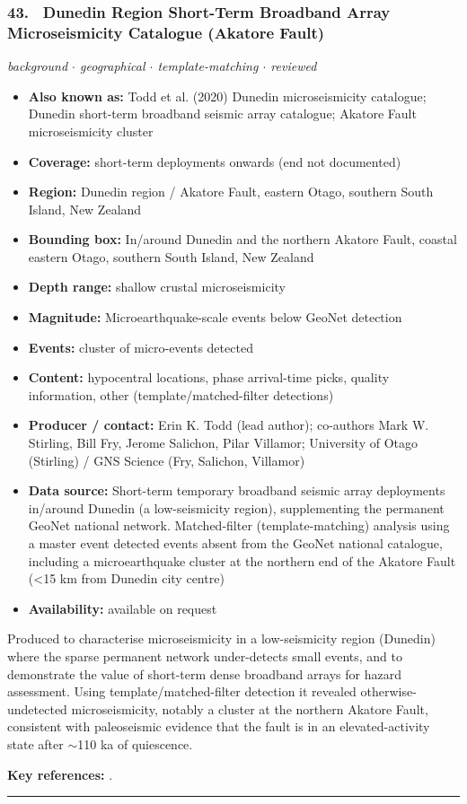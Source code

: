 \documentclass[10pt,a4paper]{article}
\newcommand{\catentryrule}{\par\vspace{3pt}\noindent\textcolor{rulegrey}{\rule{\linewidth}{0.3pt}}\par\vspace{5pt}}
\newcommand{\kv}[2]{\item \textbf{#1:} #2}
\begin{document}
\subsubsection*{\hypertarget{c:43}{43.}~ Dunedin Region Short-Term Broadband Array Microseismicity Catalogue (Akatore Fault)}
{\small\itshape background $\cdot$ geographical $\cdot$ template-matching $\cdot$ reviewed}\par\vspace{2pt}
\begin{itemize}[leftmargin=1.3em,itemsep=0.6pt,topsep=1pt,parsep=0pt]
\kv{Also known as}{Todd et al. (2020) Dunedin microseismicity catalogue; Dunedin short-term broadband seismic array catalogue; Akatore Fault microseismicity cluster}
\kv{Coverage}{short-term deployments onwards (end not documented)}
\kv{Region}{Dunedin region / Akatore Fault, eastern Otago, southern South Island, New Zealand}
\kv{Bounding box}{In/around Dunedin and the northern Akatore Fault, coastal eastern Otago, southern South Island, New Zealand}
\kv{Depth range}{shallow crustal microseismicity}
\kv{Magnitude}{Microearthquake-scale events below GeoNet detection}
\kv{Events}{cluster of micro-events detected}
\kv{Content}{hypocentral locations, phase arrival-time picks, quality information, other (template/matched-filter detections)}
\kv{Producer / contact}{Erin K. Todd (lead author); co-authors Mark W. Stirling, Bill Fry, Jerome Salichon, Pilar Villamor; University of Otago (Stirling) / GNS Science (Fry, Salichon, Villamor)}
\kv{Data source}{Short-term temporary broadband seismic array deployments in/around Dunedin (a low-seismicity region), supplementing the permanent GeoNet national network. Matched-filter (template-matching) analysis using a master event detected events absent from the GeoNet national catalogue, including a microearthquake cluster at the northern end of the Akatore Fault (\textless{}15 km from Dunedin city centre)}
\kv{Availability}{available on request}
\end{itemize}
\par\vspace{2pt}Produced to characterise microseismicity in a low-seismicity region (Dunedin) where the sparse permanent network under-detects small events, and to demonstrate the value of short-term dense broadband arrays for hazard assessment. Using template/matched-filter detection it revealed otherwise-undetected microseismicity, notably a cluster at the northern Akatore Fault, consistent with paleoseismic evidence that the fault is in an elevated-activity state after $\sim$110 ka of quiescence.
\par\vspace{2pt}\textbf{Key references:} \cite{Todd2020}.
\catentryrule
\end{document}

